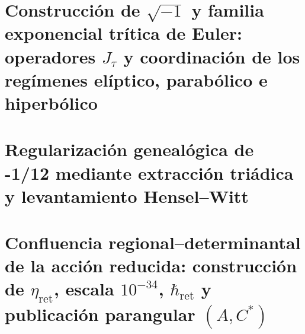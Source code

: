 \chapter{Construcción de \texorpdfstring{\(\sqrt{-1}\)}{√(−1)} y familia exponencial trítica de Euler: operadores \texorpdfstring{\(J_\tau\)}{J_τ} y coordinación de los regímenes elíptico, parabólico e hiperbólico}
\label{chap:sucesor-102-12}



\chapter{Regularización genealógica de -1/12 mediante extracción triádica y levantamiento Hensel–Witt}
\label{chap:sucesor-102-13}


\chapter{Confluencia regional–determinantal de la acción reducida: construcción de \texorpdfstring{\(\eta_{\mathrm{ret}}\)}{η_ret}, escala \texorpdfstring{\(10^{-34}\)}{10⁻³⁴}, \texorpdfstring{\(\hbar_{\mathrm{ret}}\)}{ℏ_ret} y publicación parangular \texorpdfstring{\((A,C^*)\)}{(A,C*)}}
\label{chap:sucesor-102-14}
























